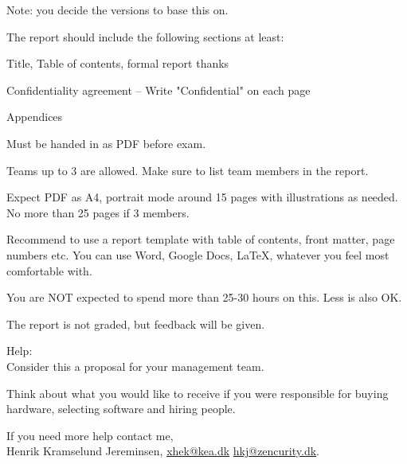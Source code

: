 \documentclass[a4paper,11pt,notitlepage,landscape]{report}
\begin{document}
Note: you decide the versions to base this on.

The report should include the following sections at least:
\begin{list2}
\item Title, Table of contents, formal report thanks
\item Confidentiality agreement -- Write "Confidential" on each page
\item Appendices
\end{list2}


Must be handed in as PDF before exam.

Teams up to 3 are allowed. Make sure to list team members in the report.

Expect PDF as A4, portrait mode around 15 pages with illustrations as needed.
No more than 25 pages if 3 members.

Recommend to use a report template with table of contents, front matter, page numbers etc. You can use Word, Google Docs, \LaTeX, whatever you feel most comfortable with.

You are NOT expected to spend more than 25-30 hours on this. Less is also OK.

The report is not graded, but feedback will be given.

Help:\\
Consider this a proposal for your management team.

Think about what you would like to receive if you were responsible for buying hardware, selecting software and hiring people.

If you need more help contact me,\\


Henrik Kramselund Jereminsen, \url{xhek@kea.dk} \url{hkj@zencurity.dk}.
\end{document}
